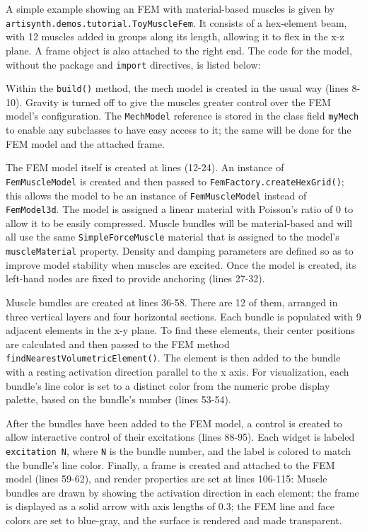 A simple example showing an FEM with material-based muscles is given by {\tt
artisynth.demos.tutorial.ToyMuscleFem}. It consists of a hex-element beam, with
12 muscles added in groups along its length, allowing it to flex in the x-z
plane. A frame object is also attached to the right end. The code for the
model, without the package and {\tt import} directives, is listed below:
%
\lstset{numbers=left}
\iflatexml

\else

\fi
\lstset{numbers=none}
%

Within the {\tt build()} method, the mech model is created in the usual way
(lines 8-10). Gravity is turned off to give the muscles greater control over
the FEM model's configuration. The {\tt MechModel} reference is stored in the
class field {\tt myMech} to enable any subclasses to have easy access to it;
the same will be done for the FEM model and the attached frame.

The FEM model itself is created at lines (12-24). An instance of {\tt
FemMuscleModel} is created and then passed to {\tt FemFactory.createHexGrid()};
this allows the model to be an instance of {\tt FemMuscleModel} instead of {\tt
FemModel3d}.  The model is assigned a linear material with Poisson's ratio of 0
to allow it to be easily compressed. Muscle bundles will be material-based and
will all use the same {\tt SimpleForceMuscle} material that is assigned to the
model's {\tt muscleMaterial} property. Density and damping parameters are
defined so as to improve model stability when muscles are excited.  Once the
model is created, its left-hand nodes are fixed to provide anchoring (lines
27-32).

Muscle bundles are created at lines 36-58. There are 12 of them, arranged in
three vertical layers and four horizontal sections. Each bundle is populated
with 9 adjacent elements in the x-y plane. To find these elements, their center
positions are calculated and then passed to the FEM method {\tt
findNearestVolumetricElement()}. The element is then added to the bundle with a
resting activation direction parallel to the x axis. For visualization, each
bundle's line color is set to a distinct color from the numeric probe display
palette, based on the bundle's number (lines 53-54).

After the bundles have been added to the FEM model, a control is created to
allow interactive control of their excitations (lines 88-95). Each widget is
labeled {\tt excitation N}, where {\tt N} is the bundle number, and the label
is colored to match the bundle's line color.  Finally, a frame is created and
attached to the FEM model (lines 59-62), and render properties are set at lines
106-115: Muscle bundles are drawn by showing the activation direction in each
element; the frame is displayed as a solid arrow with axis lengths of 0.3; the
FEM line and face colors are set to blue-gray, and the surface is rendered and
made transparent.

